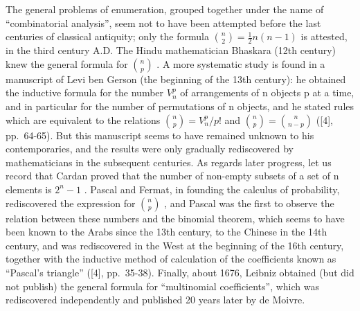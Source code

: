 The general problems of enumeration, grouped together under the name of ``combinatorial analysis'', seem not to have been attempted before the last centuries of classical antiquity; only the formula \(\binom{n}{2} = \frac{1}{2} n(n - 1)\) is attested, in the third century A.D. The Hindu mathematician Bhaskara (12th century) knew the general formula for \(\binom{n}{p}\) . A more systematic study is found in a manuscript of Levi ben Gerson (the beginning of the 13th century): he obtained the inductive formula for the number \(V_{n}^{p}\) of arrangements of n objects p at a time, and in particular for the number of permutations of n objects, and he stated rules which are equivalent to the relations \(\binom{n}{p} = V_{n}^{p}/p!\) and \(\binom{n}{p} = \binom{n}{n-p}\) ({[}4{]}, pp.~64-65). But this manuscript seems to have remained unknown to his contemporaries, and the results were only gradually rediscovered by mathematicians in the subsequent centuries. As regards later progress, let us record that Cardan proved that the number of non-empty subsets of a set of n elements is \(2^{n} - 1\) . Pascal and Fermat, in founding the calculus of probability, rediscovered the expression for \(\binom{n}{p}\) , and Pascal was the first to observe the relation between these numbers and the binomial theorem, which seems to have been known to the Arabs since the 13th century, to the Chinese in the 14th century, and was rediscovered in the West at the beginning of the 16th century, together with the inductive method of calculation of the coefficients known as ``Pascal's triangle'' ({[}4{]}, pp.~35-38). Finally, about 1676, Leibniz obtained (but did not publish) the general formula for ``multinomial coefficients'', which was rediscovered independently and published 20 years later by de Moivre.

